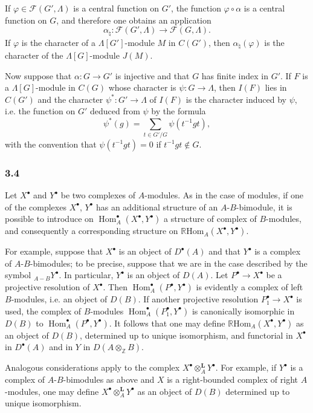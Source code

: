 \documentclass[11pt]{article}
\DeclareMathOperator{\Hom}{Hom}
\providecommand{\Hom}{\operatorname{Hom}}
\providecommand{\Hom}{\operatorname{Hom}}
\begin{document}
If $\varphi\in\mathcal F(G',\Lambda)$ is a central function on $G'$, the function $\varphi\circ\alpha$ is a central function on $G$, and therefore one obtains an application
\[
\alpha_\natural: \mathcal F(G',\Lambda)\longrightarrow\mathcal F(G,\Lambda).
\]
If $\varphi$ is the character of a $\Lambda[G']$-module $M$ in $C(G')$, then $\alpha_\natural(\varphi)$ is the character of the $\Lambda[G]$-module $J(M)$.

Now suppose that $\alpha:G\to G'$ is injective and that $G$ has finite index in $G'$. If $F$ is a $\Lambda[G]$-module in $C(G)$ whose character is $\psi:G\to\Lambda$, then $I(F)$ lies in $C(G')$ and the character $\psi^*:G'\to\Lambda$ of $I(F)$ is the character induced by $\psi$, i.e. the function on $G'$ deduced from $\psi$ by the formula
\[
\psi^*(g)=\sum_{t\in G'/G}\psi(t^{-1}gt),
\tag{3.3.1}
\]
with the convention that $\psi(t^{-1}gt)=0$ if $t^{-1}gt\notin G$.

\subsubsection*{3.4}

Let $X^\bullet$ and $Y^\bullet$ be two complexes of $A$-modules. As in the case of modules, if one of the complexes $X^\bullet$, $Y^\bullet$ has an additional structure of an $A$-$B$-bimodule, it is possible to introduce on $\Hom_A^\bullet(X^\bullet,Y^\bullet)$ a structure of complex of $B$-modules, and consequently a corresponding structure on $\mathbb{R}\mathrm{Hom}_A(X^\bullet,Y^\bullet)$.

For example, suppose that $X^\bullet$ is an object of $D^\bullet(A)$ and that $Y^\bullet$ is a complex of $A$-$B$-bimodules; to be precise, suppose that we are in the case described by the symbol ${}_{A-B}Y^\bullet$. In particular, $Y^\bullet$ is an object of $D(A)$. Let $P^\bullet\to X^\bullet$ be a projective resolution of $X^\bullet$. Then $\Hom_A^\bullet(P^\bullet,Y^\bullet)$ is evidently a complex of left $B$-modules, i.e. an object of $D(B)$. If another projective resolution $P_1^\bullet\to X^\bullet$ is used, the complex of $B$-modules $\Hom_A^\bullet(P_1^\bullet,Y^\bullet)$ is canonically isomorphic in $D(B)$ to $\Hom_A^\bullet(P^\bullet,Y^\bullet)$. It follows that one may define $\mathbb{R}\mathrm{Hom}_A(X^\bullet,Y^\bullet)$ as an object of $D(B)$, determined up to unique isomorphism, and functorial in $X^\bullet$ in $D^\bullet(A)$ and in $Y$ in $D(A\otimes_{\mathbb Z}B)$.

Analogous considerations apply to the complex $X^\bullet\otimes_A^{\mathbf L}Y^\bullet$. For example, if $Y^\bullet$ is a complex of $A$-$B$-bimodules as above and $X$ is a right-bounded complex of right $A$-modules, one may define $X^\bullet\otimes_A^{\mathbf L}Y^\bullet$ as an object of $D(B)$ determined up to unique isomorphism.
\end{document}
